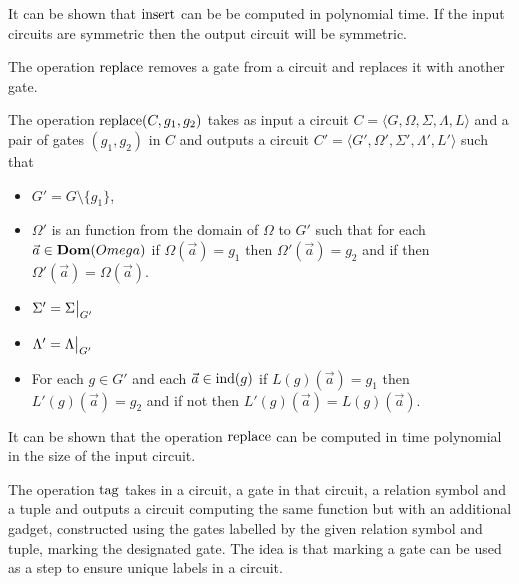 \documentclass[../paper.tex]{subfiles}
\begin{document}
It can be shown that $\text{\upshape insert}$ can be be computed in polynomial time. If the
input circuits are symmetric then the output circuit will be symmetric.

The operation $\text{\upshape replace}$ removes a gate from a circuit and replaces it with
another gate.
  
\begin{definition}
  The operation $\text{\upshape replace}(C, g_1, g_2)$ takes as input a circuit $C =
  \langle G, \Omega, \Sigma, \Lambda, L\rangle$ and a pair of gates $(g_1, g_2)$
  in $C$ and outputs a circuit $C' = \langle G', \Omega', \Sigma', \Lambda', L'
  \rangle$ such that
  \begin{itemize}
    \setlength\itemsep{0mm}
  \item $G' = G \setminus \{g_1\}$,
  \item $\Omega'$ is an function from the domain of $\Omega$ to $G'$ such that
    for each $\vec{a} \in \text{\textbf{Dom}}(Omega)$ if $\Omega(\vec{a}) = g_1$ then
    $\Omega'(\vec{a}) = g_2$ and if then $\Omega'(\vec{a}) = \Omega(\vec{a})$.
  \item $\Sigma' = \restr{\Sigma}{G'}$
  \item $\Lambda' = \restr{\Lambda}{G'}$
  \item For each $g \in G'$ and each $\vec{a} \in \text{\upshape ind}(g)$ if $L(g)(\vec{a}) =
    g_1$ then $L'(g)(\vec{a}) = g_2$ and if not then $L'(g)(\vec{a}) =
    L(g)(\vec{a})$.
  \end{itemize}
\end{definition}

It can be shown that the operation $\text{\upshape replace}$ can be computed in time
polynomial in the size of the input circuit.

The operation $\text{\upshape tag}$ takes in a circuit, a gate in that circuit, a relation
symbol and a tuple and outputs a circuit computing the same function but with an
additional gadget, constructed using the gates labelled by the given relation
symbol and tuple, marking the designated gate. The idea is that marking a gate
can be used as a step to ensure unique labels in a circuit.
\end{document}
